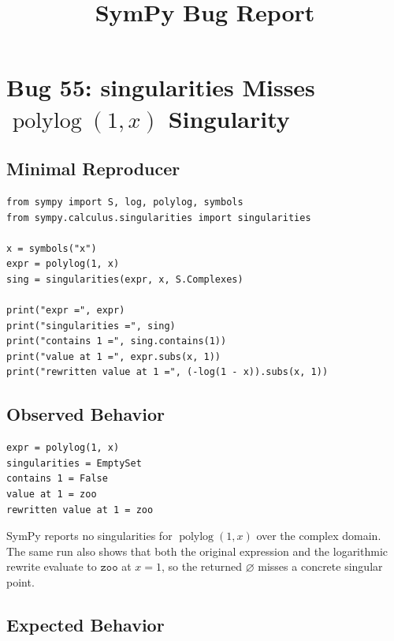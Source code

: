 \documentclass[11pt]{article}
\title{SymPy Bug Report}
\date{}
\begin{document}
\author{}
\maketitle

\section{Bug 55: \texorpdfstring{singularities Misses \(\operatorname{polylog}(1,x)\) Singularity}{singularities Misses polylog(1,x) Singularity}}

\subsection{Minimal Reproducer}

\medskip

\begin{lstlisting}[style=bugpython]
from sympy import S, log, polylog, symbols
from sympy.calculus.singularities import singularities

x = symbols("x")
expr = polylog(1, x)
sing = singularities(expr, x, S.Complexes)

print("expr =", expr)
print("singularities =", sing)
print("contains 1 =", sing.contains(1))
print("value at 1 =", expr.subs(x, 1))
print("rewritten value at 1 =", (-log(1 - x)).subs(x, 1))
\end{lstlisting}

\subsection{Observed Behavior}

\medskip

\begin{lstlisting}[style=bugpython]
expr = polylog(1, x)
singularities = EmptySet
contains 1 = False
value at 1 = zoo
rewritten value at 1 = zoo
\end{lstlisting}

SymPy reports no singularities for \(\operatorname{polylog}(1,x)\) over the complex domain.  The same run also shows that both the original expression and the logarithmic rewrite evaluate to \(\mathtt{zoo}\) at \(x=1\), so the returned \(\varnothing\) misses a concrete singular point.

\subsection{Expected Behavior}
\end{document}
